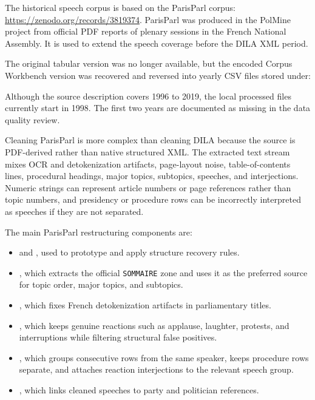 \documentclass[11pt,a4paper]{article}
\begin{document}
The historical speech corpus is based on the ParisParl corpus:
\url{https://zenodo.org/records/3819374}. ParisParl was produced in the
PolMine project from official PDF reports of plenary sessions in the French
National Assembly. It is used to extend the speech coverage before the DILA XML
period.

The original tabular version was no longer available, but the encoded Corpus
Workbench version was recovered and reversed into yearly CSV files stored under:

\begin{center}
\end{center}

Although the source description covers 1996 to 2019, the local processed files
currently start in 1998. The first two years are documented as missing in the
data quality review.

Cleaning ParisParl is more complex than cleaning DILA because the source is
PDF-derived rather than native structured XML. The extracted text stream mixes
OCR and detokenization artifacts, page-layout noise, table-of-contents lines,
procedural headings, major topics, subtopics, speeches, and interjections.
Numeric strings can represent article numbers or page references rather than
topic numbers, and presidency or procedure rows can be incorrectly interpreted
as speeches if they are not separated.

The main ParisParl restructuring components are:

\begin{itemize}
  \item {} and , used to
  prototype and apply structure recovery rules.
  \item {}, which extracts the official
  \texttt{SOMMAIRE} zone and uses it as the preferred source for topic order,
  major topics, and subtopics.
  \item {}, which fixes French detokenization
  artifacts in parliamentary titles.
  \item {}, which keeps genuine reactions such
  as applause, laughter, protests, and interruptions while filtering structural
  false positives.
  \item {}, which groups consecutive rows from the
  same speaker, keeps procedure rows separate, and attaches reaction
  interjections to the relevant speech group.
  \item {}, which links cleaned speeches to party and
  politician references.
\end{itemize}
\end{document}
